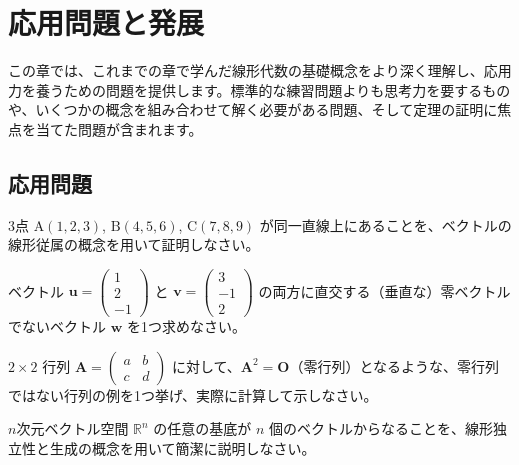 \section{応用問題と発展}

この章では、これまでの章で学んだ線形代数の基礎概念をより深く理解し、応用力を養うための問題を提供します。標準的な練習問題よりも思考力を要するものや、いくつかの概念を組み合わせて解く必要がある問題、そして定理の証明に焦点を当てた問題が含まれます。

\subsection{応用問題}

\begin{quiz}
3点 $\text{A}(1, 2, 3)$, $\text{B}(4, 5, 6)$, $\text{C}(7, 8, 9)$ が同一直線上にあることを、ベクトルの線形従属の概念を用いて証明しなさい。
\end{quiz}

\begin{quiz}
ベクトル $\bm{u} = \begin{pmatrix} 1 \\ 2 \\ -1 \end{pmatrix}$ と $\bm{v} = \begin{pmatrix} 3 \\ -1 \\ 2 \end{pmatrix}$ の両方に直交する（垂直な）零ベクトルでないベクトル $\bm{w}$ を1つ求めなさい。
\end{quiz}

\begin{quiz}
$2 \times 2$ 行列 $\bm{A} = \begin{pmatrix} a & b \\ c & d \end{pmatrix}$ に対して、$\bm{A}^2 = \bm{O}$（零行列）となるような、零行列ではない行列の例を1つ挙げ、実際に計算して示しなさい。
\end{quiz}

\begin{quiz}
$n$次元ベクトル空間 $\mathbb{R}^n$ の任意の基底が $n$ 個のベクトルからなることを、線形独立性と生成の概念を用いて簡潔に説明しなさい。
\end{quiz}


